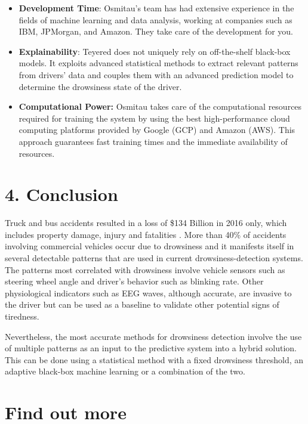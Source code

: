 \documentclass[12pt]{extarticle}
\begin{document}
\begin{itemize}
\item
  \textbf{Development Time}: Osmitau's team has had extensive experience
  in the fields of machine learning and data analysis, working at
  companies such as IBM, JPMorgan, and Amazon. They take care of the
  development for you.
\item
  \textbf{Explainability}: Teyered does not uniquely rely on
  off-the-shelf black-box models. It exploits advanced statistical
  methods to extract relevant patterns from drivers' data and couples
  them with an advanced prediction model to determine the drowsiness
  state of the driver.
\item
  \textbf{Computational Power:} Osmitau takes care of the computational
  resources required for training the system by using the best
  high-performance cloud computing platforms provided by Google (GCP)
  and Amazon (AWS). This approach guarantees fast training times and the
  immediate availability of resources.
\end{itemize}
\newpage

\hypertarget{conclusion}{%
\section{4. Conclusion}\label{conclusion}}

Truck and bus accidents resulted in a loss of \$134 Billion in 2016 only, which includes property damage, injury and fatalities
\cite{federal_motor_carrier_safety_administration_pocket_2018}. More
than 40\% of accidents involving commercial vehicles occur due to
drowsiness \cite{flatley_sleep-related_2004} and it manifests itself in
several detectable patterns that are used in current
drowsiness-detection systems. The patterns most correlated with
drowsiness involve vehicle sensors such as steering wheel angle and
driver's behavior such as blinking rate. Other physiological indicators
such as EEG waves, although accurate, are invasive to the driver but can
be used as a baseline to validate other potential signs of tiredness.

Nevertheless, the most accurate methods for drowsiness detection involve
the use of multiple patterns as an input to the predictive system into a
hybrid solution. This can be done using a statistical method with a
fixed drowsiness threshold, an adaptive black-box machine learning or a
combination of the two.

\hypertarget{find-out-more}{%
\section{Find out more}\label{find-out-more}}
\end{document}
